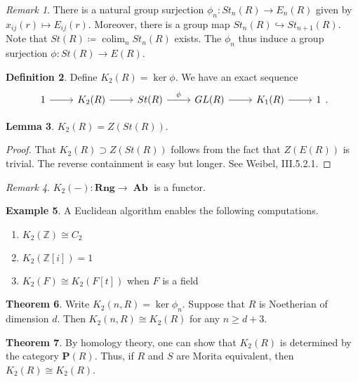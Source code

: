 \documentclass[10pt,letterpaper,cm]{nupset}
\theoremstyle{definition}
\newtheorem{definition}{Definition}
\newtheorem{exmp}[definition]{Example}
\theoremstyle{theorem}
\newtheorem{theorem}[definition]{Theorem}
\newtheorem{lemma}[definition]{Lemma}
\theoremstyle{remark}
\newtheorem{remark}[definition]{Remark}
\renewcommand{\P}{\mathbf P}
\newcommand{\Z}{\mathbb Z}
\newcommand{\1}{\mathbf{1}}
\newcommand{\0}{\vec 0}
\DeclareMathOperator{\colim}{colim}
\DeclareMathOperator{\Ab}{\mathbf{Ab}}
\begin{document}
\begin{remark}
There is a natural group surjection $\phi_n : St_n(R) \to E_n(R)$ given by $x_{ij}(r) \mapsto E_{ij}(r)$. Moreover, there is a group map $St_n(R) \hookrightarrow St_{n+1}(R)$. Note that $St(R)\coloneqq \colim_n St_n(R)$ exists. The $\phi_n$ thus induce a group surjection $\phi : St(R) \to E(R)$.
\end{remark}

\begin{definition}
Define $K_2(R)  = \ker \phi$. We have an exact sequence
\[
\begin{tikzcd}
1 \arrow[r] & K_2(R) \arrow[r] & St(R) \arrow[r, "\phi"] & GL(R) \arrow[r] & K_1(R) \arrow[r] & 1
\end{tikzcd}.
\]
\end{definition}

\begin{lemma}
$K_2(R) = Z(St(R))$.
\end{lemma}
\begin{proof}
That $K_2(R) \supset Z(St(R))$ follows from the fact that $Z(E(R))$ is trivial. The reverse containment is easy but longer. See Weibel, III.5.2.1.
\end{proof}

\begin{remark}
$K_2(-) : \mathbf{Rng} \to \Ab$ is a functor.
\end{remark}

\begin{exmp} A Euclidean algorithm enables the following computations.
\begin{enumerate}
\item $K_2(\Z) \cong C_2$
\item $K_2(\Z[i]) =1$
\item $K_2(F) \cong K_2(F[t])$ when $F$ is a field
\end{enumerate}
\end{exmp}

\begin{theorem}
Write $K_2(n, R) = \ker \phi_n$. Suppose that $R$ is Noetherian of dimension $d$. Then $K_2(n, R) \cong K_2(R)$ for any $n\geq d +3$.
\end{theorem}

\begin{theorem}
By homology theory, one can show that $K_2(R)$ is determined by the category $\P(R)$. Thus, if $R$ and $S$ are Morita equivalent, then $K_2(R) \cong K_2(R)$.
\end{theorem}
\end{document}

